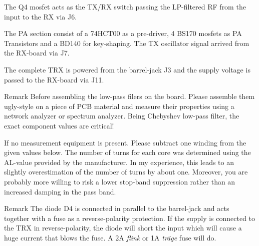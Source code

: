 \documentclass[10pt, a4paper]{scrartcl}
\newenvironment{remark}{\begin{bclogo}[couleur=blue!30,arrondi=.1,logo=\bcinfo,ombre=true]{Remark}}{\end{bclogo}}
\begin{document}
The Q4 mosfet acts as the TX/RX switch passing the LP-filtered RF from the input to the RX via J6.

The PA section consist of a 74HCT00 as a pre-driver, 4 BS170 mosfets as PA Transistors and a BD140 for key-shaping. The TX oscillator signal arrived from the RX-board via J7.

The complete TRX is powered from the barrel-jack J3 and the supply voltage is passed to the RX-board via J11. 

\begin{remark}
Before assembling the low-pass filers on the board. Please assemble them ugly-style on a piece of PCB material and measure their properties using a network analyzer or spectrum analyzer. Being Chebyshev low-pass filter, the exact component values are critical!
\end{remark}

 If no measurement equipment is present. Please subtract one winding from the given values below. The number of turns for each core was determined using the AL-value provided by the manufacturer. In my experience, this leads to an slightly overestimation of the number of turns by about one. Moreover, you are probably more willing to risk a lower stop-band suppression rather than an increased damping in the pass band.
 
 \begin{remark}
 The diode D4 is connected in parallel to the barrel-jack and acts together with a fuse as a reverse-polarity protection. If the supply is connected to the TRX in reverse-polarity, the diode will short the input which will cause a huge current that blows the fuse. A 2A \emph{flink} or 1A \emph{träge} fuse will do.
 \end{remark}
 
\end{document}
